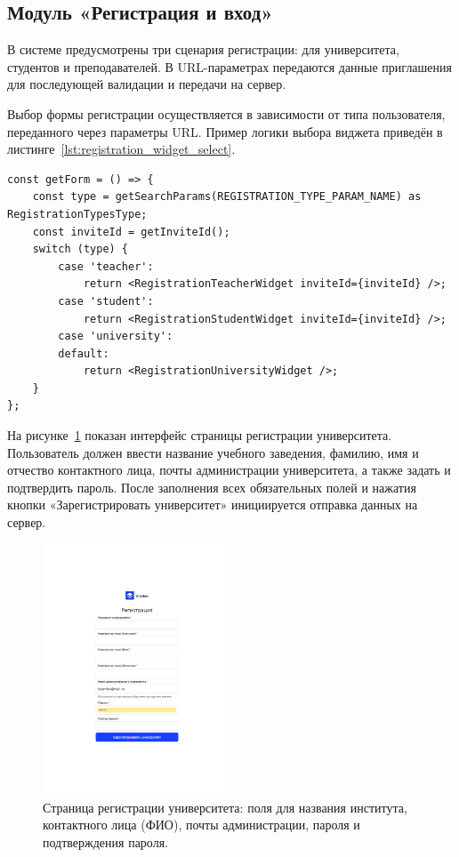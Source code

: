\subsection{Модуль «Регистрация и вход»}

В системе предусмотрены три сценария регистрации: для университета, студентов и преподавателей. В URL-параметрах передаются данные приглашения для последующей валидации и передачи на сервер.

Выбор формы регистрации осуществляется в зависимости от типа пользователя, переданного через параметры URL. Пример логики выбора виджета приведён в листинге~\ref{lst:registration_widget_select}.

\begin{lstlisting}[caption={Выбор виджета регистрации по типу}, label={lst:registration_widget_select}]
const getForm = () => {
    const type = getSearchParams(REGISTRATION_TYPE_PARAM_NAME) as RegistrationTypesType;
    const inviteId = getInviteId();
    switch (type) {
        case 'teacher':
            return <RegistrationTeacherWidget inviteId={inviteId} />;
        case 'student':
            return <RegistrationStudentWidget inviteId={inviteId} />;
        case 'university':
        default:
            return <RegistrationUniversityWidget />;
    }
};
\end{lstlisting}
На рисунке~\ref{fig:registration_university} показан интерфейс страницы регистрации университета. Пользователь должен ввести название учебного заведения, фамилию, имя и отчество контактного лица, почты администрации университета, а также задать и подтвердить пароль. После заполнения всех обязательных полей и нажатия кнопки «Зарегистрировать университет» инициируется отправка данных на сервер.

\begin{figure}[h]
    \centering
    \includegraphics[width=0.5\textwidth]{static/presintation/RegPage.png} %
    \caption{Страница регистрации университета: поля для названия института, контактного лица (ФИО), почты администрации, пароля и подтверждения пароля.}
    \label{fig:registration_university}
\end{figure}

